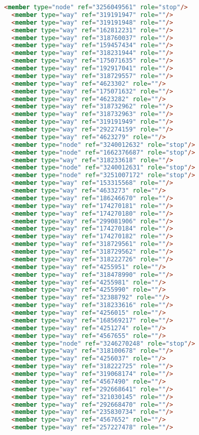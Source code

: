 \begin{lstlisting}[language=HTML,basicstyle=\tiny,caption=test.xml]
  <member type="node" ref="3256049561" role="stop"/>
  <member type="way" ref="319191947" role=""/>
  <member type="way" ref="319191948" role=""/>
  <member type="way" ref="162812231" role=""/>
  <member type="way" ref="318760037" role=""/>
  <member type="way" ref="159457434" role=""/>
  <member type="way" ref="318231944" role=""/>
  <member type="way" ref="175071635" role=""/>
  <member type="way" ref="192917041" role=""/>
  <member type="way" ref="318729557" role=""/>
  <member type="way" ref="4623302" role=""/>
  <member type="way" ref="175071632" role=""/>
  <member type="way" ref="4623282" role=""/>
  <member type="way" ref="318732962" role=""/>
  <member type="way" ref="318732963" role=""/>
  <member type="way" ref="319191949" role=""/>
  <member type="way" ref="292274159" role=""/>
  <member type="way" ref="4623279" role=""/>
  <member type="node" ref="3240012632" role="stop"/>
  <member type="node" ref="1662376687" role="stop"/>
  <member type="way" ref="318233618" role=""/>
  <member type="node" ref="3240012631" role="stop"/>
  <member type="node" ref="3251007172" role="stop"/>
  <member type="way" ref="153315568" role=""/>
  <member type="way" ref="4633273" role=""/>
  <member type="way" ref="186246670" role=""/>
  <member type="way" ref="174270181" role=""/>
  <member type="way" ref="174270180" role=""/>
  <member type="way" ref="299081906" role=""/>
  <member type="way" ref="174270184" role=""/>
  <member type="way" ref="174270182" role=""/>
  <member type="way" ref="318729561" role=""/>
  <member type="way" ref="318729562" role=""/>
  <member type="way" ref="318222726" role=""/>
  <member type="way" ref="4255951" role=""/>
  <member type="way" ref="318478990" role=""/>
  <member type="way" ref="4255981" role=""/>
  <member type="way" ref="4255990" role=""/>
  <member type="way" ref="32388792" role=""/>
  <member type="way" ref="318233616" role=""/>
  <member type="way" ref="4256015" role=""/>
  <member type="way" ref="168569217" role=""/>
  <member type="way" ref="4251274" role=""/>
  <member type="way" ref="4567655" role=""/>
  <member type="node" ref="3246270248" role="stop"/>
  <member type="way" ref="318100678" role=""/>
  <member type="way" ref="4256037" role=""/>
  <member type="way" ref="318222725" role=""/>
  <member type="way" ref="319068174" role=""/>
  <member type="way" ref="4567490" role=""/>
  <member type="way" ref="292668641" role=""/>
  <member type="way" ref="321030145" role=""/>
  <member type="way" ref="292668470" role=""/>
  <member type="way" ref="235830734" role=""/>
  <member type="way" ref="4567652" role=""/>
  <member type="way" ref="257227478" role=""/>

\end{lstlisting}
